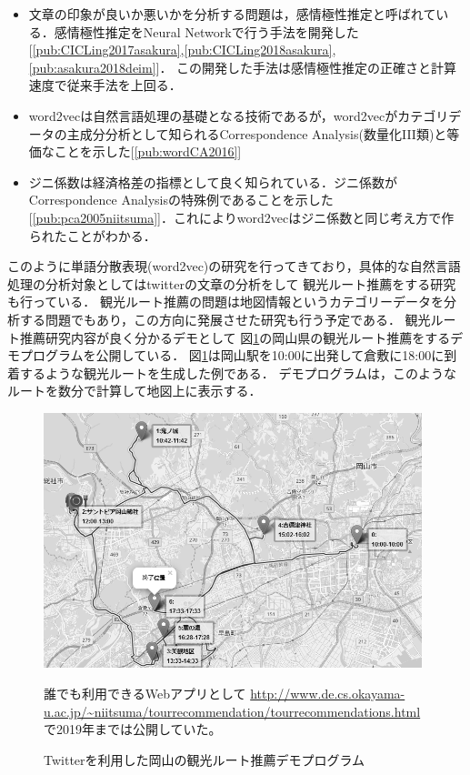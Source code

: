 \documentclass[11pt,a4j,dvipdfmx]{jarticle} 					%
\newcommand{\研究課題名}{人工知能のためのLispシステム}
\newcommand{\研究機関名}{大阪公立大学工業高等専門学校}
\newcommand{\研究代表者氏名}{新妻弘崇}
\newcommand{\研究期間の最終元号年度}{11}  %
\begin{document}
\begin{itemize}
\item 文章の印象が良いか悪いかを分析する問題は，感情極性推定と呼ばれている．感情極性推定をNeural Networkで行う手法を開発した[\ref{pub:CICLing2017asakura},\ref{pub:CICLing2018asakura},\ref{pub:asakura2018deim}]．
  この開発した手法は感情極性推定の正確さと計算速度で従来手法を上回る．
  
\item word2vecは自然言語処理の基礎となる技術であるが，word2vecがカテゴリデータの主成分分析として知られるCorrespondence Analysis(数量化III類)と等価なことを示した[\ref{pub:wordCA2016}]
\item ジニ係数は経済格差の指標として良く知られている．ジニ係数がCorrespondence Analysisの特殊例であることを示した[\ref{pub:pca2005niitsuma}]．これによりword2vecはジニ係数と同じ考え方で作られたことがわかる．
\end{itemize}
このように単語分散表現(word2vec)の研究を行ってきており，具体的な自然言語処理の分析対象としてはtwitterの文章の分析をして
観光ルート推薦をする研究も行っている．
観光ルート推薦の問題は地図情報というカテゴリーデータを分析する問題でもあり，この方向に発展させた研究も行う予定である．
観光ルート推薦研究内容が良く分かるデモとして
図\ref{fig:okayama-tour-demo}の岡山県の観光ルート推薦をするデモプログラムを公開している．
図\ref{fig:okayama-tour-demo}は岡山駅を10:00に出発して倉敷に18:00に到着するような観光ルートを生成した例である．
デモプログラムは，このようなルートを数分で計算して地図上に表示する．
\begin{figure}[h]
  \centering     
  \includegraphics[keepaspectratio,width=11cm]{okayama-tour-demo-g.png}
  \caption{Twitterを利用した岡山の観光ルート推薦デモプログラム}
  \label{fig:okayama-tour-demo}

  誰でも利用できるWebアプリとして
  \url{
    http://www.de.cs.okayama-u.ac.jp/~niitsuma/tourrecommendation/tourrecommendations.html
  }
  で2019年までは公開していた。
   
\end{figure}
\end{document}
